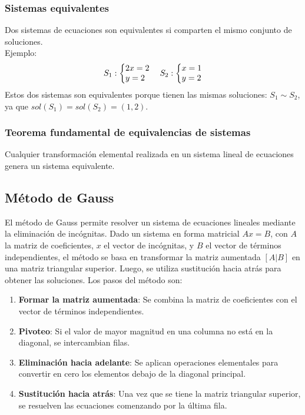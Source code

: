 \documentclass{article}
\begin{document}
    \subsubsection{Sistemas equivalentes}
    
    Dos sistemas de ecuaciones son equivalentes si comparten el mismo conjunto de soluciones.
    \\Ejemplo:
    \[
    S_1: \left \{
    \begin{array}{@{}l@{}}
    2x = 2 \\
    y = 2
    \end{array}
    \right.
    \quad
    S_2: \left \{
    \begin{array}{@{}l@{}}
    x = 1 \\
    y = 2
    \end{array}
    \right.
    \]
    Estos dos sistemas son equivalentes porque tienen las mismas soluciones: $S_1 \sim S_2$, ya que $sol(S_1) = sol(S_2) = (1,2)$.
    
    \subsubsection*{Teorema fundamental de equivalencias de sistemas}
    
    Cualquier transformación elemental realizada en un sistema lineal de ecuaciones genera un sistema equivalente.

    \newpage
    
    \subsection{Método de Gauss}
    
    El método de Gauss permite resolver un sistema de ecuaciones lineales mediante la eliminación de incógnitas. Dado un sistema en forma matricial $Ax = B$, con $A$ la matriz de coeficientes, $x$ el vector de incógnitas, y $B$ el vector de términos independientes, el método se basa en transformar la matriz aumentada $[A|B]$ en una matriz triangular superior. Luego, se utiliza sustitución hacia atrás para obtener las soluciones. Los pasos del método son:
        
    \begin{enumerate}
        \item \textbf{Formar la matriz aumentada}: Se combina la matriz de coeficientes con el vector de términos independientes.
        \item \textbf{Pivoteo}: Si el valor de mayor magnitud en una columna no está en la diagonal, se intercambian filas.
        \item \textbf{Eliminación hacia adelante}: Se aplican operaciones elementales para convertir en cero los elementos debajo de la diagonal principal.
        \item \textbf{Sustitución hacia atrás}: Una vez que se tiene la matriz triangular superior, se resuelven las ecuaciones comenzando por la última fila.
    \end{enumerate}
\end{document}
